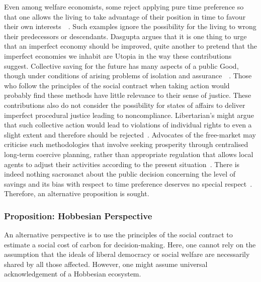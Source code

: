 \documentclass[11pt, oneside]{article}   	%
\begin{document}
Even among welfare economists, some reject applying pure time preference so that one allows the living to take advantage of their position in time to favour their own interests~\cite{hs1}~\cite{fr1}. Such examples ignore the possibility for the living to wrong their predecessors or descendants. Dasgupta argues that it is one thing to urge that an imperfect economy should be improved, quite another to pretend that the imperfect economies we inhabit are Utopia in the way these contributions suggest. Collective saving for the future has many aspects of a public Good, though under conditions of arising problems of isolation and assurance~\cite{as1}~\cite{ms1}.  Those who follow the principles of the social contract when taking action would probably find these methods have little relevance to their sense of justice. These contributions also do not consider the possibility for states of affairs to deliver imperfect procedural justice leading to noncompliance. Libertarian's might argue that such collective action would lead to violations of individual rights to even a slight extent and therefore should be rejected~\cite{rn1}. Advocates of the free-market may criticise such methodologies that involve seeking prosperity through centralised long-term coercive planning, rather than appropriate regulation that allows local agents to adjust their activities according to the present situation~\cite{fh1}. There is indeed nothing sacrosanct about the public decision concerning the level of savings and its bias with respect to time preference deserves no special respect~\cite{jr1}. Therefore, an alternative proposition is sought.

\subsubsection{Proposition: Hobbesian Perspective}

An alternative perspective is to use the principles of the social contract to estimate a social cost of carbon for decision-making.
Here, one cannot rely on the assumption that the ideals of liberal democracy or social welfare are necessarily shared by all those affected.
However, one might assume universal acknowledgement of a Hobbesian ecosystem.
\end{document}
